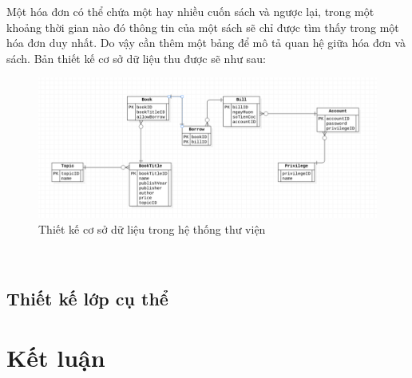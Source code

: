 \documentclass[12pt]{report}
\begin{document}
Một hóa đơn có thể chứa một hay nhiều cuốn sách và ngược lại, trong một khoảng 
thời gian nào đó thông tin của một sách sẽ chỉ được tìm thấy trong một hóa đơn duy nhất. 
Do vậy cần thêm một bảng để mô tả quan hệ giữa hóa đơn và sách.
 Bản thiết kế cơ sở dữ liệu thu được sẽ như sau:
\begin{figure}[H]
\centering
\includegraphics[width=\textwidth]{figures/db.png}
\caption{Thiết kế cơ sở dữ liệu trong hệ thống thư viện}
\end{figure}



\
\subsection{Thiết kế lớp cụ thể}

\section{Kết luận}
\end{document}
